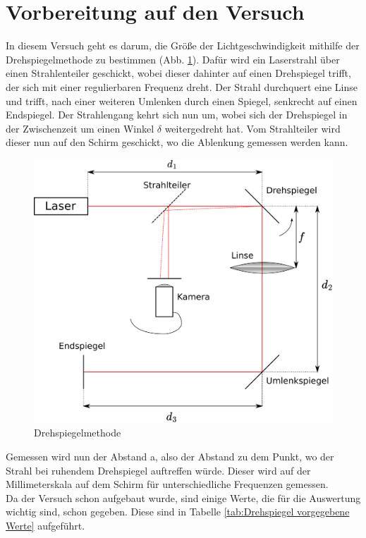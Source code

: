 \section{Vorbereitung auf den Versuch}

In diesem Versuch geht es darum, die Größe der Lichtgeschwindigkeit mithilfe der Drehspiegelmethode zu bestimmen (Abb. \ref{fig:Drehspiegelmethode}). Dafür wird ein Laserstrahl über einen Strahlenteiler geschickt, wobei dieser dahinter auf einen Drehspiegel trifft, der sich mit einer regulierbaren Frequenz dreht. Der Strahl durchquert eine Linse und trifft, nach einer weiteren Umlenken durch einen Spiegel, senkrecht auf einen Endspiegel. Der Strahlengang kehrt sich nun um, wobei sich der Drehspiegel in der Zwischenzeit um einen Winkel $\delta$ weitergedreht hat. Vom Strahlteiler wird dieser nun auf den Schirm geschickt, wo die Ablenkung gemessen werden kann.\\

\begin{figure}
    \centering
    \includegraphics[scale=0.6]{Lichtgeschwindigkeit/Protokoll/fig/Drehspiegelmethode.png}
    \caption{Drehspiegelmethode}
    \label{fig:Drehspiegelmethode}
\end{figure}

Gemessen wird nun der Abstand a, also der Abstand zu dem Punkt, wo der Strahl bei ruhendem Drehspiegel auftreffen würde. Dieser wird auf der Millimeterskala auf dem Schirm für unterschiedliche Frequenzen gemessen.\\
Da der Versuch schon aufgebaut wurde, sind einige Werte, die für die Auswertung wichtig sind, schon gegeben. Diese sind in Tabelle \ref{tab:Drehspiegel vorgegebene Werte} aufgeführt.

